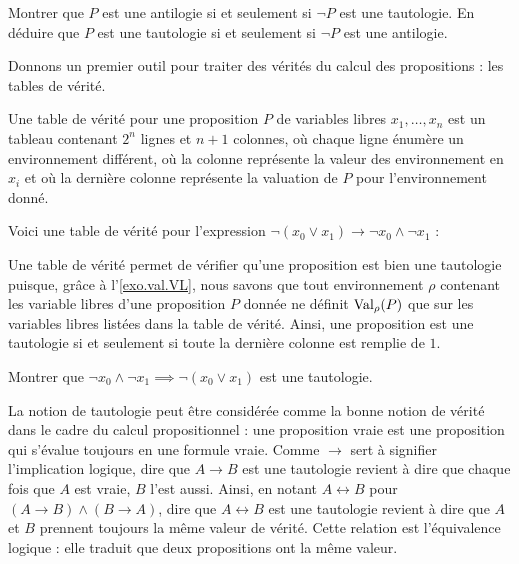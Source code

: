 \begin{exercise}
  Montrer que $P$ est une antilogie si et seulement si $\lnot P$ est une
  tautologie. En déduire que $P$ est une tautologie si et seulement si $\lnot P$
  est une antilogie.
\end{exercise}

Donnons un premier outil pour traiter des vérités du calcul des propositions :
les tables de vérité.

\begin{definition}
  Une table de vérité pour une proposition $P$ de variables libres
  $x_1,\ldots,x_n$ est un tableau contenant $2^n$ lignes et $n+1$ colonnes, où
  chaque ligne énumère un environnement différent, où la
   colonne représente la valeur des environnement en
  $x_i$ et où la dernière colonne représente la valuation de $P$ pour
  l'environnement donné.
\end{definition}

\begin{example}
  Voici une table de vérité pour l'expression
  $\lnot (x_0 \lor x_1)\to \lnot x_0 \land \lnot x_1$ :
\end{example}

Une table de vérité permet de vérifier qu'une proposition est bien une
tautologie puisque, grâce à l'\cref{exo.val.VL}, nous savons que tout
environnement $\rho$ contenant les variable libres d'une proposition $P$ donnée
ne définit $\operatorname{Val}_\rho(P)$ que sur les variables libres listées dans la table de
vérité. Ainsi, une proposition est une tautologie si et seulement si toute la
dernière colonne est remplie de $1$.

\begin{exercise}
  Montrer que $\lnot x_0\land \lnot x_1 \implies \lnot (x_0\lor x_1)$ est une
  tautologie.
\end{exercise}

La notion de tautologie peut être considérée comme la bonne notion de vérité
dans le cadre du calcul propositionnel : une proposition vraie est une
proposition qui s'évalue toujours en une formule vraie. Comme $\to$ sert à
signifier l'implication logique, dire que $A \to B$ est une tautologie revient à
dire que chaque fois que $A$ est vraie, $B$ l'est aussi. Ainsi, en notant
$A \leftrightarrow B$ pour $(A \to B) \land (B \to A)$, dire que
$A \leftrightarrow B$ est une tautologie revient à dire que $A$ et $B$ prennent
toujours la même valeur de vérité. Cette relation est l'équivalence logique :
elle traduit que deux propositions ont la même valeur.

